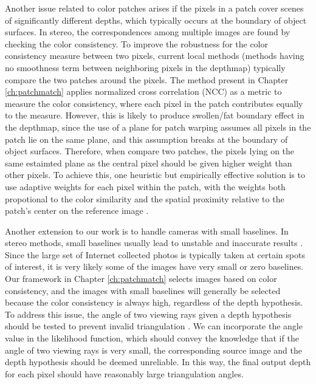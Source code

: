 Another issue related to color patches arises if the pixels in a patch cover scenes of significantly different depths, which typically occurs at the boundary of object surfaces. 
In stereo, the correspondences among multiple images are found by checking the color consistency.
To improve the robustness for the color consistency measure between two pixels, current local methods (\ie methods having no smoothness term between neighboring pixels in the depthmap) typically compare the two patches around the pixels. The method present in Chapter \ref{ch:patchmatch} applies normalized cross correlation (NCC) as a metric to measure the color consistency, where each pixel in the patch contributes equally to the measure. 
However, this is likely to produce swollen/fat boundary effect in the depthmap, since the use of a plane for patch warping assumes all pixels in the patch lie on the same plane, and this assumption breaks at the boundary of object surfaces. 
Therefore, when compare two patches, the pixels lying on the same estaimted plane as the central pixel should be given higher weight than other pixels. To achieve this, one heuristic but empirically effective solution is to use adaptive weights for each pixel within the patch, with the weights both propotional to the color similarity and the spatial proximity relative to the patch's center on the reference image \cite{Yoon06adaptivesupport_weight}. 

Another extension to our work is to handle cameras with small baselines. In stereo methods, small baselines usually lead to unstable and inaccurate results \cite{Hartley2004}. Since the large set of Internet collected photos is typically taken at certain spots of interest, it is very likely some of the images have very small or zero baselines. Our framework in Chapter \ref{ch:patchmatch} selects images based on color consistency, and the images with small baselines will generally be selected because the color consistency is always high, regardless of the depth hypothesis. To address this issue, the angle of two viewing rays given a depth hypothesis should be tested to prevent invalid triangulation \cite{Gallup08}. We can incorporate the angle value in the likelihood function, which should convey the knowledge that if the angle of two viewing rays is very small, the corresponding source image and the depth hypothesis should be deemed unreliable. In this way, the final output depth for each pixel should have reasonably large triangulation angles.

